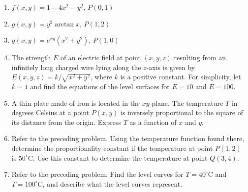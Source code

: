 \documentclass{exercises}
\begin{document}
\begin{enumerate}[resume]
\item $f(x,y)=1-4x^{2}-y^{2}$, $P(0,1)$
\item $g(x,y)=y^{2}\arctan x$, $P(1,2)$
\item $g(x,y)=e^{xy}(x^{2}+y^{2})$, $P(1,0)$
\item The strength $E$ of an electric field at point $(x,y,z)$ resulting from an infinitely long charged wire lying along the $z$-axis is given by $E(x,y,z)=k/\sqrt{x^{2}+y^{2}}$, where $k$ is a positive constant. For simplicity, let $k=1$ and find the equations of the level surfaces for $E=10$ and $E=100$.
\item A thin plate made of iron is located in the $xy$-plane. The temperature $T$ in degrees Celsius at a point $P(x,y)$ is inversely proportional to the square of its distance from the origin. Express $T$ as a function of $x$ and $y$.
\item Refer to the preceding problem. Using the temperature function found there, determine the proportionality constant if the temperature at point $P(1,2)$ is $50^\circ \text{C}$. Use this constant to determine the temperature at point $Q(3,4)$.
\item Refer to the preceding problem. Find the level curves for $T=40^\circ \text{C}$ and $T=100^\circ \text{C}$, and describe what the level curves represent.
\end{enumerate}
\end{document}
